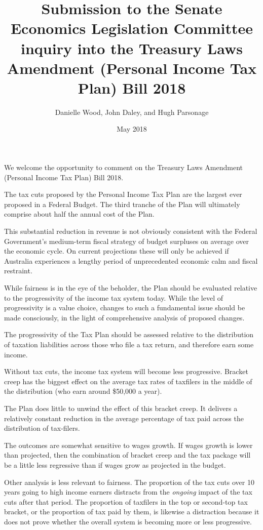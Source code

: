 \documentclass[submission]{grattan}\usepackage[]{graphicx}\usepackage[]{color}
\date{May 2018}
\title{Submission to the Senate Economics Legislation Committee inquiry into the Treasury Laws Amendment (Personal Income Tax Plan) Bill 2018}
\author{Danielle Wood, John Daley, and Hugh Parsonage}
\begin{document}
\begin{summary}

We welcome the opportunity to comment on the Treasury Laws Amendment (Personal Income Tax Plan) Bill 2018.

The tax cuts proposed by the Personal Income Tax Plan are the largest ever proposed in a Federal Budget. The third tranche of the Plan will ultimately comprise about half the annual cost of the Plan.

This substantial reduction in revenue is not obviously consistent with the Federal Government's medium-term fiscal strategy of budget surpluses on average over the economic cycle. On current projections these will only be achieved if Australia experiences a lengthy period of unprecedented economic calm and fiscal restraint.

While fairness is in the eye of the beholder, the Plan should be evaluated relative to the progressivity of the income tax system today. While the level of progressivity is a value choice, changes to such a fundamental issue should be made consciously, in the light of comprehensive analysis of proposed changes.

The progressivity of the Tax Plan should be assessed relative to the distribution of taxation liabilities across those who file a tax return, and therefore earn some income.

Without tax cuts, the income tax system will become less progressive. Bracket creep has the biggest effect on the average tax rates of taxfilers in the middle of the distribution (who earn around \$50,000 a year).

The Plan does little to unwind the effect of this bracket creep. It delivers a relatively constant reduction in the average percentage of tax paid across the distribution of tax-filers.

The outcomes are somewhat sensitive to wages growth. If wages growth is lower than projected, then the combination of bracket creep and the tax package will be a little less regressive than if wages grow as projected in the budget.

Other analysis is less relevant to fairness. The proportion of the tax cuts over 10 years going to high income earners distracts from the \emph{ongoing} impact of the tax cuts after that period. The proportion of taxfilers in the top or second-top tax bracket, or the proportion of tax paid by them, is likewise a distraction because it does not prove whether the overall system is becoming more or less progressive.
\end{summary}
\end{document}
